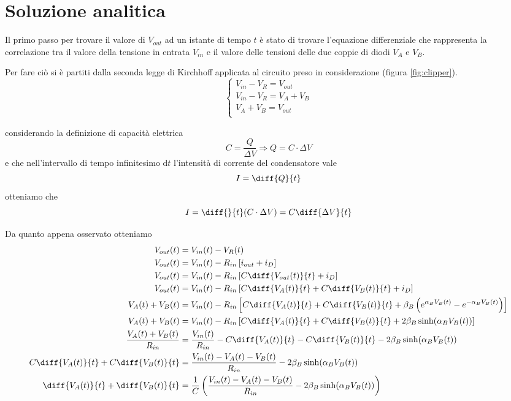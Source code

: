 \raggedbottom
\chapter{Soluzione analitica}

	Il primo passo per trovare il valore di $V_{out}$ ad un istante di tempo $t$ è stato di trovare l'equazione differenziale che rappresenta la correlazione tra il valore della tensione in entrata $V_{in}$ e il valore delle tensioni delle due coppie di diodi $V_{A}$ e $V_{B}$.
	
	Per fare ciò si è partiti dalla seconda legge di Kirchhoff applicata al circuito preso in considerazione (figura \ref{fig:clipper}).
	\[
	\begin{cases}
		V_{in}-V_{R} = V_{out}\\
		V_{in}-V_{R} = V_{A}+V_{B}\\
		V_{A}+V_{B} = V_{out}\\
	\end{cases}
	\]
	
	considerando la definizione di capacità elettrica
	\[
		C = \frac{Q}{\Delta V} \Rightarrow Q = C \cdot \Delta V
	\]
	e che nell'intervallo di tempo infinitesimo $\mathrm{d}t$ l'intensità di corrente del condensatore vale 
	\[
		I = \diff{Q}{t}
	\]
	otteniamo che
	\[
		I = \diff{}{t}(C \cdot \Delta V) = C\diff{\Delta V}{t}
	\]
	\pagebreak
	
	Da quanto appena osservato otteniamo
	\begin{equation}
		\label{eq:differenziale}
		\begin{split}
			V_{out}(t) &= V_{in}(t)-V_{R}(t)\\
			V_{out}(t) &= V_{in}(t)-R_{in}\left[i_{out}+i_{D}\right]\\
			V_{out}(t) &= V_{in}(t)-R_{in}\left[C\diff{V_{out}(t)}{t}+i_{D}\right]\\
			V_{out}(t) &= V_{in}(t)-R_{in}\left[C\diff{V_{A}(t)}{t}+C\diff{V_{B}(t)}{t}+i_{D}\right]\\
			V_{A}(t)+V_{B}(t) &= V_{in}(t)-R_{in}\left[C\diff{V_{A}(t)}{t}+C\diff{V_{B}(t)}{t}+\beta_{B}\left(e^{\alpha_{B}V_{B}(t)}-e^{-\alpha_{B}V_{B}(t)}\right)\right]\\
			V_{A}(t)+V_{B}(t) &= V_{in}(t)-R_{in}\left[C\diff{V_{A}(t)}{t}+C\diff{V_{B}(t)}{t}+2\beta_{B}\sinh(\alpha_{B}V_{B}(t))\right]\\
			\frac{V_{A}(t)+V_{B}(t)}{R_{in}} &= \frac{V_{in}(t)}{R_{in}}-C\diff{V_{A}(t)}{t}-C\diff{V_{B}(t)}{t}-2\beta_{B}\sinh(\alpha_{B}V_{B}(t))\\
			C\diff{V_{A}(t)}{t}+C\diff{V_{B}(t)}{t} &= \frac{V_{in}(t)-V_{A}(t)-V_{B}(t)}{R_{in}}-2\beta_{B}\sinh(\alpha_{B}V_{B}(t))\\
			\diff{V_{A}(t)}{t}+\diff{V_{B}(t)}{t} &= \frac{1}{C}\left(\frac{V_{in}(t)-V_{A}(t)-V_{B}(t)}{R_{in}}-2\beta_{B}\sinh(\alpha_{B}V_{B}(t))\right)\\
		\end{split}
	\end{equation}
	\pagebreak
	
